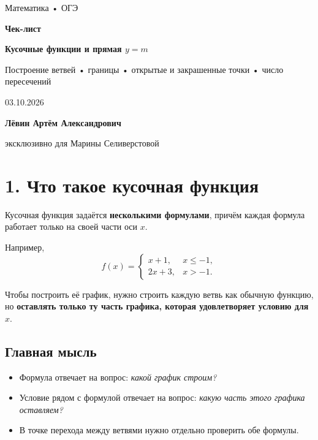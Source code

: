\documentclass[a4paper,12pt]{article}
\newcommand{\sectionline}{\par\vspace{1mm}{\color{accent}\rule{\linewidth}{0.6pt}}\par\vspace{1mm}}
\newcommand{\key}[1]{\textbf{\color{darkaccent}#1}}
\begin{document}
\thispagestyle{empty}
\begin{center}
\vspace*{18mm}
{\Large\color{textgray}Математика • ОГЭ}\par
\vspace{8mm}
{\Huge\bfseries\color{darkaccent}Чек-лист}\par
\vspace{5mm}
{\LARGE\bfseries Кусочные функции и прямая $y=m$}\par
\vspace{12mm}
{\large Построение ветвей • границы • открытые и закрашенные точки • число пересечений}\par
\vfill
{\large 03.10.2026}\par
\vspace{10mm}
{\large\bfseries Лёвин Артём Александрович}\par
{\large эксклюзивно для Марины Селиверстовой}\par
\vspace{18mm}
\end{center}
\clearpage

\section*{1. Что такое кусочная функция}
\sectionline
Кусочная функция задаётся \key{несколькими формулами}, причём каждая формула работает только на своей части оси $x$.

Например,
\[
f(x)=
\begin{cases}
 x+1, & x\le -1,\\
 2x+3, & x>-1.
\end{cases}
\]

Чтобы построить её график, нужно строить каждую ветвь как обычную функцию, но \key{оставлять только ту часть графика, которая удовлетворяет условию для $x$}.

\subsection*{Главная мысль}
\begin{itemize}
  \item Формула отвечает на вопрос: \emph{какой график строим?}
  \item Условие рядом с формулой отвечает на вопрос: \emph{какую часть этого графика оставляем?}
  \item В точке перехода между ветвями нужно отдельно проверить обе формулы.
\end{itemize}
\end{document}
